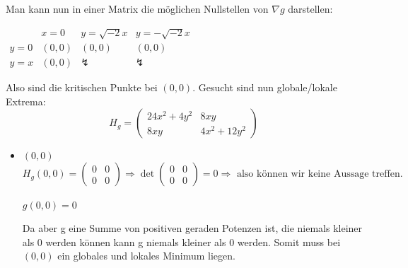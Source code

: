 \documentclass[10pt,a4paper,parskip=half]{scrartcl}
\begin{document}
\begin{enumerate}[(i)]
Man kann nun in einer Matrix die möglichen Nullstellen von $\nabla g$ darstellen: \\
\begin{center}
\begin{math}
	\begin{array}{c|ccc}
	 & x = 0 & y = \sqrt{-2} x & y = - \sqrt{-2} x\\
	 \hline
	 y = 0 & (0,0) & (0,0) & (0,0) \\
	 y = x & (0,0) & \lightning & \lightning
	\end{array}
\end{math}
\end{center}
Also sind die kritischen Punkte bei $(0,0)$. Gesucht sind nun globale/lokale Extrema:
	\[H_g = 
	\begin{pmatrix}
		24x^2 + 4y^2 & 8xy \\
		8xy & 4x^2 + 12y^2
	\end{pmatrix} \]
	\begin{itemize}
		\item 	$(0,0)$
			\[H_g(0,0) = 
			\begin{pmatrix}
				0 & 0 \\
				0 & 0		
			\end{pmatrix} \Rightarrow 
			\det \begin{pmatrix}
				0 & 0 \\
				0 & 0		
			\end{pmatrix} = 0 \Rightarrow \text{ also können wir keine Aussage treffen.}\]\\
			$g(0,0) = 0$
			
			Da aber g eine Summe von positiven geraden Potenzen ist, die niemals kleiner als 0 werden können kann g niemals kleiner als 0 werden. Somit muss bei $(0,0)$ ein globales und lokales Minimum liegen.
	\end{itemize}
\end{enumerate}
\end{document}
